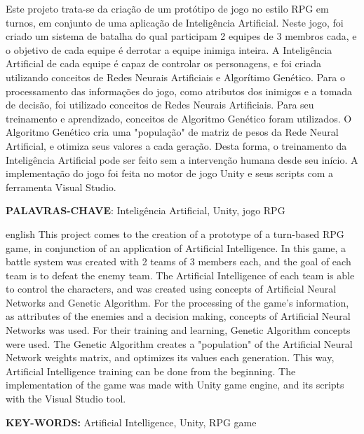 \documentclass[
	12pt,					%
	openright,				%
	oneside,				%
	a4paper,				%
	bibjustif,				%
	chapter=TITLE,			%
	english,				%
	brazil,					%
	]{abntex2}
\begin{document}
\newpage %
\thispagestyle{empty} %
\begin{resumo}
	\SingleSpacing
	Este projeto trata-se da criação de um protótipo de jogo no estilo RPG em turnos,
	em conjunto de uma aplicação de Inteligência Artificial.
	Neste jogo, foi criado um sistema de batalha do qual participam 2 equipes de 3 membros cada,
	e o objetivo de cada equipe é derrotar a equipe inimiga inteira.
	A Inteligência Artificial de cada equipe é capaz de controlar os personagens,
	e foi criada utilizando conceitos de Redes Neurais Artificiais e Algorítimo Genético.
	Para o processamento das informações do jogo, como atributos dos inimigos e a tomada de decisão,
	foi utilizado conceitos de Redes Neurais Artificiais.
	Para seu treinamento e aprendizado, conceitos de Algoritmo Genético foram utilizados.
	O Algoritmo Genético cria uma "população"{} de matriz de pesos da Rede Neural Artificial,
	e otimiza seus valores a cada geração.
	Desta forma, o treinamento da Inteligência Artificial pode ser feito sem a intervenção humana desde seu início.
	A implementação do jogo foi feita no motor de jogo Unity
	e seus scripts com a ferramenta Visual Studio.
 	
 	\vspace{\onelineskip}
	\textbf{PALAVRAS-CHAVE}: Inteligência Artificial, Unity, jogo RPG
\end{resumo}


\newpage %
\thispagestyle{empty} %
\begin{resumo}[Abstract]
	\begin{otherlanguage*}{english}
		\SingleSpacing
		This project comes to the creation of a prototype of a turn-based RPG game,
		in conjunction of an application of Artificial Intelligence.
		In this game, a battle system was created with 2 teams of 3 members each,
		and the goal of each team is to defeat the enemy team.
		The Artificial Intelligence of each team is able to control the characters,
		and was created using concepts of Artificial Neural Networks and Genetic Algorithm.
		For the processing of the game's information,
		as attributes of the enemies and a decision making,
		concepts of Artificial Neural Networks was used.
		For their training and learning, Genetic Algorithm concepts were used.
		The Genetic Algorithm creates a "population"{} of the Artificial Neural Network weights matrix,
		and optimizes its values each generation.
		This way, Artificial Intelligence training can be done from the beginning.
		The implementation of the game was made with Unity game engine,
		and its scripts with the Visual Studio tool.
		
		\vspace{\onelineskip}
		\textbf{KEY-WORDS:} Artificial Intelligence, Unity, RPG game
	\end{otherlanguage*}
\end{resumo}
\end{document}
